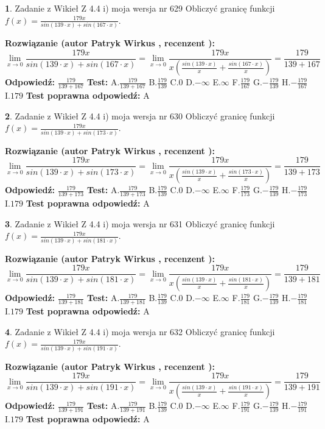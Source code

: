 \documentclass[12pt, a4paper]{article}
\theoremstyle{definition} %
\newtheorem{zad}{}
\newcommand{\zadStart}[1]{\begin{zad}#1\newline}
\newcommand{\zadStop}{\end{zad}}
\newcommand{\rozwStart}[2]{\noindent \textbf{Rozwiązanie (autor #1 , recenzent #2): }\newline}
\newcommand{\rozwStop}{\newline}
\newcommand{\odpStart}{\noindent \textbf{Odpowiedź:}\newline}
\newcommand{\odpStop}{\newline}
\newcommand{\testStart}{\noindent \textbf{Test:}\newline}
\newcommand{\testStop}{\newline}
\newcommand{\kluczStart}{\noindent \textbf{Test poprawna odpowiedź:}\newline}
\newcommand{\kluczStop}{\newline}
\begin{document}
\zadStart{Zadanie z Wikieł Z 4.4 i) moja wersja nr 629}
Obliczyć granicę funkcji $f(x)=\frac{179x}{sin(139\cdot x) +sin(167\cdot x)}$.
\zadStop
\rozwStart{Patryk Wirkus}{}
$$\lim\limits_{x\to 0}\frac{179x}{sin(139\cdot x) +sin(167\cdot x)}=\lim\limits_{x\to 0}\frac{179x}{x(\frac{sin(139\cdot x)}{x}+\frac{sin(167\cdot x)}{x})}=\frac{179}{139+167}$$
\rozwStop
\odpStart
$\frac{179}{139+167}$
\odpStop
\testStart
A.$\frac{179}{139+167}$
B.$\frac{179}{139}$
C.$0$
D.$-\infty$
E.$\infty$
F.$\frac{179}{167}$
G.$-\frac{179}{139}$
H.$-\frac{179}{167}$
I.$179$
\testStop
\kluczStart
A
\kluczStop



\zadStart{Zadanie z Wikieł Z 4.4 i) moja wersja nr 630}
Obliczyć granicę funkcji $f(x)=\frac{179x}{sin(139\cdot x) +sin(173\cdot x)}$.
\zadStop
\rozwStart{Patryk Wirkus}{}
$$\lim\limits_{x\to 0}\frac{179x}{sin(139\cdot x) +sin(173\cdot x)}=\lim\limits_{x\to 0}\frac{179x}{x(\frac{sin(139\cdot x)}{x}+\frac{sin(173\cdot x)}{x})}=\frac{179}{139+173}$$
\rozwStop
\odpStart
$\frac{179}{139+173}$
\odpStop
\testStart
A.$\frac{179}{139+173}$
B.$\frac{179}{139}$
C.$0$
D.$-\infty$
E.$\infty$
F.$\frac{179}{173}$
G.$-\frac{179}{139}$
H.$-\frac{179}{173}$
I.$179$
\testStop
\kluczStart
A
\kluczStop



\zadStart{Zadanie z Wikieł Z 4.4 i) moja wersja nr 631}
Obliczyć granicę funkcji $f(x)=\frac{179x}{sin(139\cdot x) +sin(181\cdot x)}$.
\zadStop
\rozwStart{Patryk Wirkus}{}
$$\lim\limits_{x\to 0}\frac{179x}{sin(139\cdot x) +sin(181\cdot x)}=\lim\limits_{x\to 0}\frac{179x}{x(\frac{sin(139\cdot x)}{x}+\frac{sin(181\cdot x)}{x})}=\frac{179}{139+181}$$
\rozwStop
\odpStart
$\frac{179}{139+181}$
\odpStop
\testStart
A.$\frac{179}{139+181}$
B.$\frac{179}{139}$
C.$0$
D.$-\infty$
E.$\infty$
F.$\frac{179}{181}$
G.$-\frac{179}{139}$
H.$-\frac{179}{181}$
I.$179$
\testStop
\kluczStart
A
\kluczStop



\zadStart{Zadanie z Wikieł Z 4.4 i) moja wersja nr 632}
Obliczyć granicę funkcji $f(x)=\frac{179x}{sin(139\cdot x) +sin(191\cdot x)}$.
\zadStop
\rozwStart{Patryk Wirkus}{}
$$\lim\limits_{x\to 0}\frac{179x}{sin(139\cdot x) +sin(191\cdot x)}=\lim\limits_{x\to 0}\frac{179x}{x(\frac{sin(139\cdot x)}{x}+\frac{sin(191\cdot x)}{x})}=\frac{179}{139+191}$$
\rozwStop
\odpStart
$\frac{179}{139+191}$
\odpStop
\testStart
A.$\frac{179}{139+191}$
B.$\frac{179}{139}$
C.$0$
D.$-\infty$
E.$\infty$
F.$\frac{179}{191}$
G.$-\frac{179}{139}$
H.$-\frac{179}{191}$
I.$179$
\testStop
\kluczStart
A
\kluczStop
\end{document}
